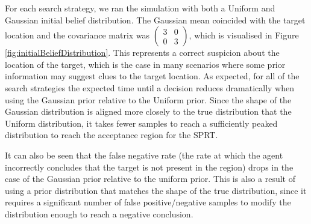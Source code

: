 For each search strategy, we ran the simulation with both a Uniform and Gaussian initial belief distribution. The Gaussian mean coincided with the target location and the covariance matrix was $\begin{pmatrix} 3 & 0\\ 0 & 3\end{pmatrix}$, which is visualised in Figure \ref{fig:initialBeliefDistribution}. This represents a correct suspicion about the location of the target, which is the case in many scenarios where some prior information may suggest clues to the target location. As expected, for all of the search strategies the expected time until a decision reduces dramatically when using the Gaussian prior relative to the Uniform prior. 
Since the shape of the Gaussian distribution is aligned more closely to the true distribution that the Uniform distribution, it takes fewer samples to reach a sufficiently peaked distribution to reach the acceptance region for the SPRT. 

\par It can also be seen that the false negative rate (the rate at which the agent incorrectly concludes that the target is not present in the region) drops in the case of the Gaussian prior relative to the uniform prior. This is also a result of using a prior distribution that matches the shape of the true distribution, since it requires a significant number of false positive/negative samples to modify the distribution enough to reach a negative conclusion.


   


